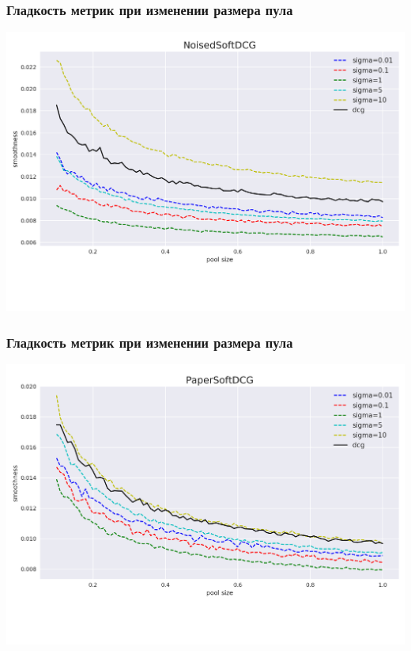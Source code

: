 \documentclass[10pt]{beamer}
\begin{document}
\begin{frame}
\frametitle{Гладкость метрик при изменении размера пула}
\includegraphics[width=\textwidth]{noised_decrease_smoothness}
\end{frame}


\begin{frame}
\frametitle{Гладкость метрик при изменении размера пула}
\includegraphics[width=\textwidth]{paper_decrease_smoothness}
\end{frame}
\end{document}
